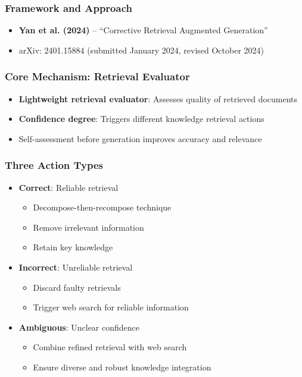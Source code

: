 \documentclass[11pt,letterpaper]{article}
\begin{document}
\subsubsection{Framework and Approach}
\begin{itemize}[leftmargin=*]
    \item \textbf{Yan et al. (2024)} -- ``Corrective Retrieval Augmented Generation'' \cite{yan2024crag}
    \item arXiv: 2401.15884 (submitted January 2024, revised October 2024)
\end{itemize}

\subsubsection{Core Mechanism: Retrieval Evaluator}
\begin{itemize}[leftmargin=*]
    \item \textbf{Lightweight retrieval evaluator}: Assesses quality of retrieved documents
    \item \textbf{Confidence degree}: Triggers different knowledge retrieval actions
    \item Self-assessment before generation improves accuracy and relevance
\end{itemize}

\subsubsection{Three Action Types}
\begin{itemize}[leftmargin=*]
    \item \textbf{Correct}: Reliable retrieval
    \begin{itemize}
        \item Decompose-then-recompose technique
        \item Remove irrelevant information
        \item Retain key knowledge
    \end{itemize}
    \item \textbf{Incorrect}: Unreliable retrieval
    \begin{itemize}
        \item Discard faulty retrievals
        \item Trigger web search for reliable information
    \end{itemize}
    \item \textbf{Ambiguous}: Unclear confidence
    \begin{itemize}
        \item Combine refined retrieval with web search
        \item Ensure diverse and robust knowledge integration
    \end{itemize}
\end{itemize}
\end{document}
